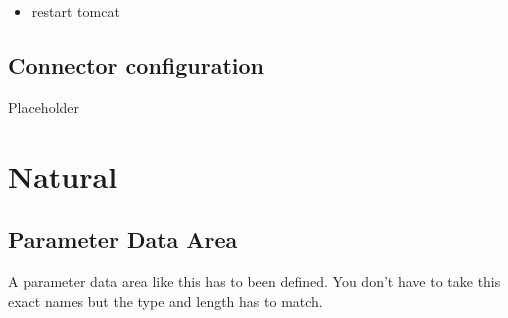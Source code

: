 \documentclass[letterpaper,10pt,english]{sphinxmanual}
\begin{document}
\begin{sphinxVerbatim}[commandchars=\\\{\}]
\end{sphinxVerbatim}
\begin{itemize}
\item {} 
restart tomcat

\end{itemize}


\subsection{Connector configuration}
\label{\detokenize{connector:connector-configuration}}
Placeholder


\section{Natural}
\label{\detokenize{natural:natural}}\label{\detokenize{natural::doc}}

\subsection{Parameter Data Area}
\label{\detokenize{natural:parameter-data-area}}\label{\detokenize{natural:pda}}
A parameter data area like this has to been defined. You don't have to take this exact names but the type and length has to match.

\begin{sphinxVerbatim}[commandchars=\\\{\}]
 
 
 
 
 
 
  
\end{sphinxVerbatim}
\end{document}
